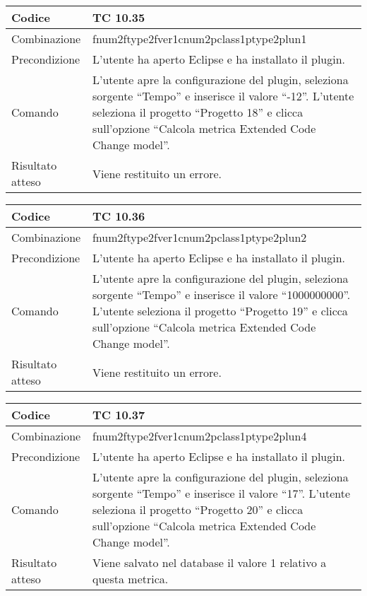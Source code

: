 \begin{table}[ht]
\begin{tabular}{|p{3cm}|p{9cm}|}
\hline
\cellcolor{lightgray}Codice				& TC 10.35								\\
\hline
\cellcolor{lightgray}Combinazione		& fnum2ftype2fver1cnum2pclass1ptype2plun1									\\
\hline
\cellcolor{lightgray}Precondizione		& L'utente ha aperto Eclipse e ha installato il plugin.		\\
\hline
\cellcolor{lightgray}Comando			& L'utente apre la configurazione del plugin, seleziona sorgente ``Tempo'' e inserisce il valore ``-12''. L'utente seleziona il progetto ``Progetto 18''  e clicca sull'opzione ``Calcola metrica Extended Code Change model''.	\\
\hline
\cellcolor{lightgray}Risultato atteso	& Viene restituito un errore.\\
\hline
\end{tabular}
\end{table}

\begin{table}[ht]
\begin{tabular}{|p{3cm}|p{9cm}|}
\hline
\cellcolor{lightgray}Codice				& TC 10.36								\\
\hline
\cellcolor{lightgray}Combinazione		& fnum2ftype2fver1cnum2pclass1ptype2plun2									\\
\hline
\cellcolor{lightgray}Precondizione		& L'utente ha aperto Eclipse e ha installato il plugin.		\\
\hline
\cellcolor{lightgray}Comando			& L'utente apre la configurazione del plugin, seleziona sorgente ``Tempo'' e inserisce il valore ``1000000000''. L'utente seleziona il progetto ``Progetto 19''  e clicca sull'opzione ``Calcola metrica Extended Code Change model''.	\\
\hline
\cellcolor{lightgray}Risultato atteso	& Viene restituito un errore.\\
\hline
\end{tabular}
\end{table}

\begin{table}[ht]
\begin{tabular}{|p{3cm}|p{9cm}|}
\hline
\cellcolor{lightgray}Codice				& TC 10.37								\\
\hline
\cellcolor{lightgray}Combinazione		& fnum2ftype2fver1cnum2pclass1ptype2plun4									\\
\hline
\cellcolor{lightgray}Precondizione		& L'utente ha aperto Eclipse e ha installato il plugin.		\\
\hline
\cellcolor{lightgray}Comando			& L'utente apre la configurazione del plugin, seleziona sorgente ``Tempo'' e inserisce il valore ``17''. L'utente seleziona il progetto ``Progetto 20''  e clicca sull'opzione ``Calcola metrica Extended Code Change model''.	\\
\hline
\cellcolor{lightgray}Risultato atteso	& Viene salvato nel database il valore 1 relativo a questa metrica.\\
\hline
\end{tabular}
\end{table}

